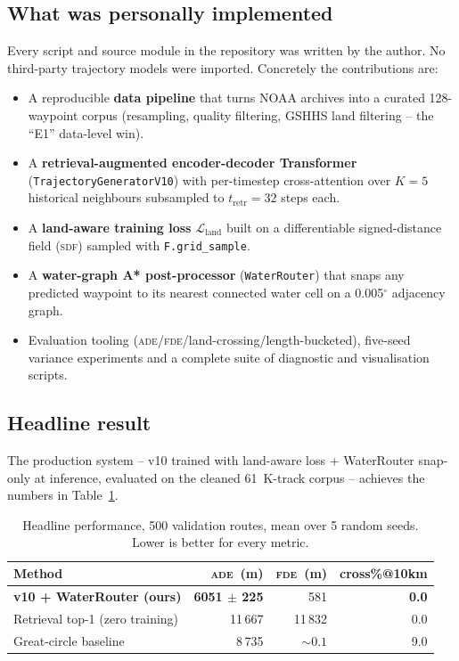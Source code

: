 \documentclass[11pt,a4paper]{article}
\newcommand{\ade}{\textsc{ade}}
\newcommand{\fde}{\textsc{fde}}
\newcommand{\sdf}{\textsc{sdf}}
\newcommand{\code}[1]{\texttt{\small #1}}
\begin{document}
\subsection{What was personally implemented}

Every script and source module in the repository was written by the
author.  No third-party trajectory models were imported.  Concretely the
contributions are:

\begin{itemize}
  \item A reproducible \textbf{data pipeline} that turns NOAA archives
        into a curated 128-waypoint corpus (resampling, quality
        filtering, GSHHS land filtering -- the ``E1'' data-level win).
  \item A \textbf{retrieval-augmented encoder-decoder Transformer}
        (\code{TrajectoryGeneratorV10}) with per-timestep cross-attention
        over $K = 5$ historical neighbours subsampled to
        $t_{\mathrm{retr}} = 32$ steps each.
  \item A \textbf{land-aware training loss} $\mathcal{L}_{\mathrm{land}}$
        built on a differentiable signed-distance field (\sdf) sampled
        with \code{F.grid\_sample}.
  \item A \textbf{water-graph A* post-processor}
        (\code{WaterRouter}) that snaps any predicted waypoint to its
        nearest connected water cell on a 0.005$^\circ$ adjacency graph.
  \item Evaluation tooling (\ade/\fde/land-crossing/length-bucketed),
        five-seed variance experiments and a complete suite of
        diagnostic and visualisation scripts.
\end{itemize}

\subsection{Headline result}

The production system -- v10 trained with land-aware loss + WaterRouter
snap-only at inference, evaluated on the cleaned 61~K-track corpus --
achieves the numbers in Table~\ref{tab:headline}.

\begin{table}[h]
\centering
\caption{Headline performance, 500 validation routes, mean over 5 random
seeds. Lower is better for every metric.}
\label{tab:headline}
\begin{tabular}{lrrr}
\toprule
\textbf{Method} & \ade~(m) & \fde~(m) & cross\%@10km \\
\midrule
\textbf{v10 + WaterRouter (ours)} & \textbf{6051 $\pm$ 225} & 581
       & \textbf{0.0} \\
Retrieval top-1 (zero training)   & 11\,667 & 11\,832 & 0.0 \\
Great-circle baseline             & 8\,735  & $\sim 0.1$ & 9.0 \\
\bottomrule
\end{tabular}
\end{table}
\end{document}

